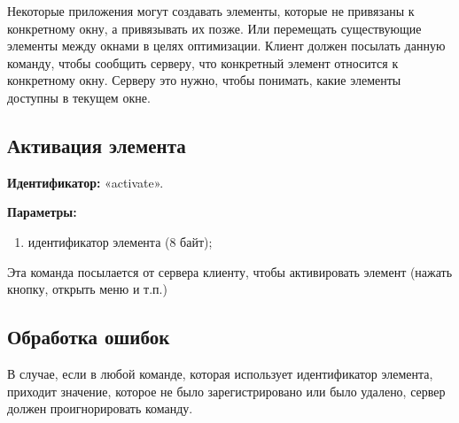 Некоторые приложения могут создавать элементы, которые не привязаны к
конкретному окну, а привязывать их позже. Или перемещать существующие элементы
между окнами в целях оптимизации. Клиент должен посылать данную команду, чтобы
сообщить серверу, что конкретный элемент относится к конкретному окну. Серверу
это нужно, чтобы понимать, какие элементы доступны в текущем окне.

\subsection{Активация элемента}

\textbf{Идентификатор:} «activate».

\textbf{Параметры:}
\begin{enumerate}
\item идентификатор элемента (8 байт);
\end{enumerate}

Эта команда посылается от сервера клиенту, чтобы активировать элемент (нажать
кнопку, открыть меню и т.п.)

\subsection{Обработка ошибок}

В случае, если в любой команде, которая использует идентификатор элемента,
приходит значение, которое не было зарегистрировано или было удалено, сервер
должен проигнорировать команду.
